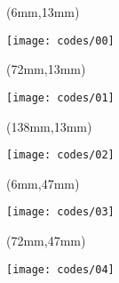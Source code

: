 
    \begin{textblock*}{66mm}(6mm,13mm)
        \begin{minipage}[t][34mm][t]{\textwidth}
        \vspace*{\fill}
        \texttt{[image: codes/00]}
        \vspace*{\fill}
        \end{minipage}
    \end{textblock*}


    \begin{textblock*}{66mm}(72mm,13mm)
        \begin{minipage}[t][34mm][t]{\textwidth}
        \vspace*{\fill}
        \texttt{[image: codes/01]}
        \vspace*{\fill}
        \end{minipage}
    \end{textblock*}


    \begin{textblock*}{66mm}(138mm,13mm)
        \begin{minipage}[t][34mm][t]{\textwidth}
        \vspace*{\fill}
        \texttt{[image: codes/02]}
        \vspace*{\fill}
        \end{minipage}
    \end{textblock*}


    \begin{textblock*}{66mm}(6mm,47mm)
        \begin{minipage}[t][34mm][t]{\textwidth}
        \vspace*{\fill}
        \texttt{[image: codes/03]}
        \vspace*{\fill}
        \end{minipage}
    \end{textblock*}


    \begin{textblock*}{66mm}(72mm,47mm)
        \begin{minipage}[t][34mm][t]{\textwidth}
        \vspace*{\fill}
        \texttt{[image: codes/04]}
        \vspace*{\fill}
        \end{minipage}
    \end{textblock*}


